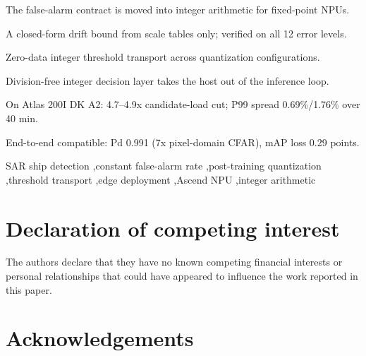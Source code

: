\documentclass[preprint,12pt]{elsarticle}
\begin{document}
\begin{frontmatter}
\begin{highlights}
\item The false-alarm contract is moved into integer arithmetic for fixed-point NPUs.
\item A closed-form drift bound from scale tables only; verified on all 12 error levels.
\item Zero-data integer threshold transport across quantization configurations.
\item Division-free integer decision layer takes the host out of the inference loop.
\item On Atlas 200I DK A2: 4.7--4.9x candidate-load cut; P99 spread 0.69\%/1.76\% over 40 min.
\item End-to-end compatible: Pd 0.991 (7x pixel-domain CFAR), mAP loss 0.29 points.
\end{highlights}

\begin{keyword}
SAR ship detection \sep constant false-alarm rate \sep post-training quantization \sep threshold transport \sep edge deployment \sep Ascend NPU \sep integer arithmetic
\end{keyword}

\end{frontmatter}







\section*{Declaration of competing interest}
The authors declare that they have no known competing financial interests or personal relationships that could have appeared to influence the work reported in this paper.

\section*{Acknowledgements}



\end{document}
